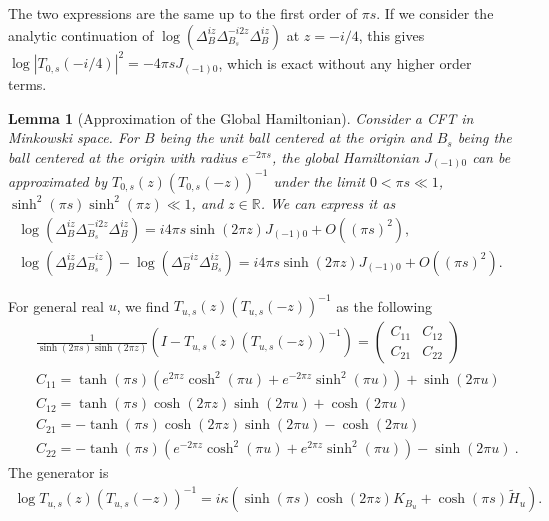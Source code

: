 \documentclass[a4paper,11pt]{article}
\newtheorem{lemma}[theorem]{Lemma}
\theoremstyle{definition}
\newcommand{\nn}{\nonumber}
\begin{document}
The two expressions are the same up to the first order of $\pi s$. If we consider the analytic continuation of $\log (\Delta_{B}^{iz}\Delta_{B_s}^{-i2z}\Delta_{B}^{iz})$ at $z = -i/4$, this gives $\log |T_{0,s}(-i/4)|^2 = -4 \pi s J_{(-1)0}$, which is exact without any higher order terms. 
\begin{lemma}[Approximation of the Global Hamiltonian]
    Consider a CFT in Minkowski space. For $B$ being the unit ball centered at the origin and $B_s$ being the ball centered at the origin with radius $e^{-2\pi s}$, the global Hamiltonian $J_{(-1)0}$ can be approximated by $T_{0,s}(z)(T_{0,s}(-z))^{-1}$ under the limit $0<\pi s \ll 1$, $ \sinh^2(\pi s)\sinh^2(\pi z)\ll 1$, and $z\in\mathbb{R}$. We can express it as 
    \begin{gather}
        \log (\Delta_{B}^{iz}\Delta_{B_s}^{-i2z}\Delta_{B}^{iz}) = i 4 \pi s \sinh(2\pi z) J_{(-1)0} + O((\pi s)^2),\\
        \log (\Delta_{B}^{iz}\Delta_{B_s}^{-iz}) - \log (\Delta_{B}^{-iz}\Delta_{B_s}^{iz}) = i 4 \pi s \sinh(2\pi z) J_{(-1)0} + O((\pi s)^2).
    \end{gather}
\end{lemma}
For general real $u$, we find $T_{u,s}(z)(T_{u,s}(-z))^{-1}$ as the following
\begin{eqnarray}
    &&\frac{1}{\sinh(2\pi s)\sinh(2\pi z)}(I - T_{u,s}(z)(T_{u,s}(-z))^{-1}) =\begin{pmatrix}
        C_{11}& C_{12}\\
        C_{21}&C_{22}
    \end{pmatrix}\nn\\
    &&C_{11}=\tanh(\pi s)(e^{2\pi z}\cosh^2(\pi u) + e^{-2\pi z}\sinh^2(\pi u)) + \sinh(2\pi u) \nn\\
    &&C_{12}=\tanh(\pi s)\cosh(2\pi z)\sinh(2\pi u) + \cosh(2\pi u) 
    \nn\\
    &&C_{21}=-\tanh(\pi s)\cosh(2\pi z)\sinh(2\pi u) - \cosh(2\pi u) \nn\\
    &&C_{22}= -\tanh(\pi s)(e^{-2\pi z}\cosh^2(\pi u) + e^{2\pi z}\sinh^2(\pi u)) - \sinh(2\pi u)\ .
\end{eqnarray}
The generator is 
\begin{align}
    \log T_{u,s}(z)(T_{u,s}(-z))^{-1} = i\kappa(\sinh(\pi s) \cosh(2\pi z) K_{B_u} + \cosh(\pi s) \tilde{H}_{u}).
\end{align}
\end{document}
